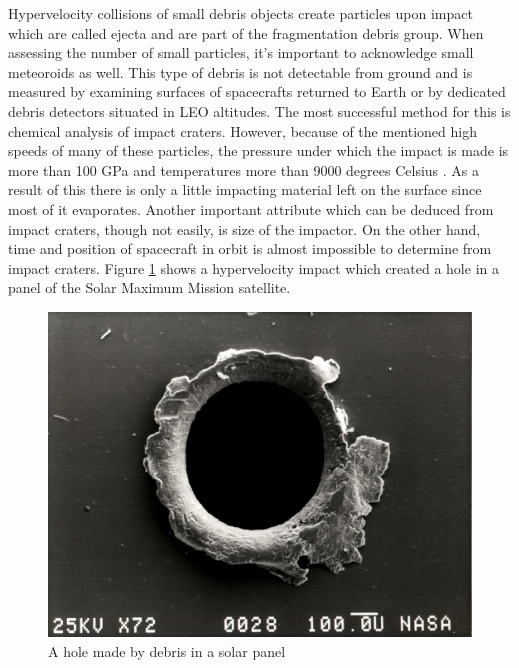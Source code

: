 	Hypervelocity collisions of small debris objects create particles upon impact which are called ejecta and are part of the fragmentation debris group. When assessing the number of small particles, it’s important to acknowledge small meteoroids as well. This type of debris is not detectable from ground and is measured by examining surfaces of spacecrafts returned to Earth or by dedicated debris detectors situated in LEO altitudes. The most successful method for this is chemical analysis of impact craters. However, because of the mentioned high speeds of many of these particles, the pressure under which the impact is made is more than 100 GPa and temperatures more than 9000 degrees Celsius \citep{klinkrad2006space}. As a result of this there is only a little impacting material left on the surface since most of it evaporates. Another important attribute which can be deduced from impact craters, though not easily, is size of the impactor.  On the other hand, time and position of spacecraft in orbit is almost impossible to determine from impact craters. Figure \ref{fig:hypervelocitycollision} shows a hypervelocity impact which created a hole in a panel of the Solar Maximum Mission satellite.
	
\begin{figure}[H]
  \includegraphics[width=\linewidth]{images/hypervelocitycollision}
  \caption{A hole made by debris in a solar panel}
  \label{fig:hypervelocitycollision}
\end{figure}	
	
